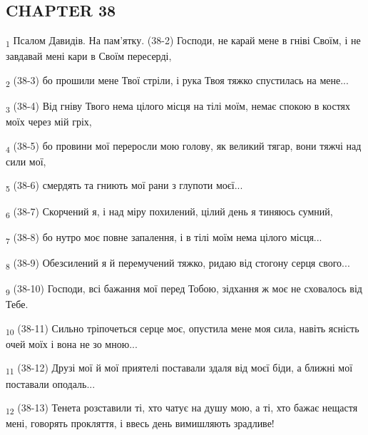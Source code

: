 \subsection{CHAPTER 38}
\begin{tcolorbox}
\textsubscript{1} Псалом Давидів. На пам'ятку. (38-2) Господи, не карай мене в гніві Своїм, і не завдавай мені кари в Своїм пересерді,
\end{tcolorbox}
\begin{tcolorbox}
\textsubscript{2} (38-3) бо прошили мене Твої стріли, і рука Твоя тяжко спустилась на мене...
\end{tcolorbox}
\begin{tcolorbox}
\textsubscript{3} (38-4) Від гніву Твого нема цілого місця на тілі моїм, немає спокою в костях моїх через мій гріх,
\end{tcolorbox}
\begin{tcolorbox}
\textsubscript{4} (38-5) бо провини мої переросли мою голову, як великий тягар, вони тяжчі над сили мої,
\end{tcolorbox}
\begin{tcolorbox}
\textsubscript{5} (38-6) смердять та гниють мої рани з глупоти моєї...
\end{tcolorbox}
\begin{tcolorbox}
\textsubscript{6} (38-7) Скорчений я, і над міру похилений, цілий день я тиняюсь сумний,
\end{tcolorbox}
\begin{tcolorbox}
\textsubscript{7} (38-8) бо нутро моє повне запалення, і в тілі моїм нема цілого місця...
\end{tcolorbox}
\begin{tcolorbox}
\textsubscript{8} (38-9) Обезсилений я й перемучений тяжко, ридаю від стогону серця свого...
\end{tcolorbox}
\begin{tcolorbox}
\textsubscript{9} (38-10) Господи, всі бажання мої перед Тобою, зідхання ж моє не сховалось від Тебе.
\end{tcolorbox}
\begin{tcolorbox}
\textsubscript{10} (38-11) Сильно тріпочеться серце моє, опустила мене моя сила, навіть ясність очей моїх і вона не зо мною...
\end{tcolorbox}
\begin{tcolorbox}
\textsubscript{11} (38-12) Друзі мої й мої приятелі поставали здаля від моєї біди, а ближні мої поставали оподаль...
\end{tcolorbox}
\begin{tcolorbox}
\textsubscript{12} (38-13) Тенета розставили ті, хто чатує на душу мою, а ті, хто бажає нещастя мені, говорять прокляття, і ввесь день вимишляють зрадливе!
\end{tcolorbox}
